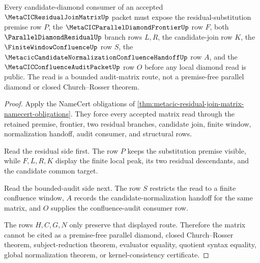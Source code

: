 \begin{theorem}
\label{thm:metacic-residual-join-matrix-candidate-diamond-boundary}
Every candidate-diamond consumer of an accepted $\MetaCICResidualJoinMatrixUp$ packet must expose the residual-substitution premise row $P$, the $\MetaCICParallelDiamondFrontierUp$ row $F$, both $\ParallelDiamondResidualUp$ branch rows $L,R$, the candidate-join row $K$, the $\FiniteWindowConfluenceUp$ row $S$, the $\MetacicCandidateNormalizationConfluenceHandoffUp$ row $A$, and the $\MetaCICConfluenceAuditPacketUp$ row $O$ before any local diamond read is public. The read is a bounded audit-matrix route, not a premise-free parallel diamond or closed Church--Rosser theorem.
\end{theorem}
\begin{proof}
Apply the NameCert obligations of \autoref{thm:metacic-residual-join-matrix-namecert-obligations}. They force every accepted matrix read through the retained premise, frontier, two residual branches, candidate join, finite window, normalization handoff, audit consumer, and structural rows.

Read the residual side first. The row $P$ keeps the substitution premise visible, while $F,L,R,K$ display the finite local peak, its two residual descendants, and the candidate common target.

Read the bounded-audit side next. The row $S$ restricts the read to a finite confluence window, $A$ records the candidate-normalization handoff for the same matrix, and $O$ supplies the confluence-audit consumer row.

The rows $H,C,G,N$ only preserve that displayed route. Therefore the matrix cannot be cited as a premise-free parallel diamond, closed Church--Rosser theorem, subject-reduction theorem, evaluator equality, quotient syntax equality, global normalization theorem, or kernel-consistency certificate.
\end{proof}



